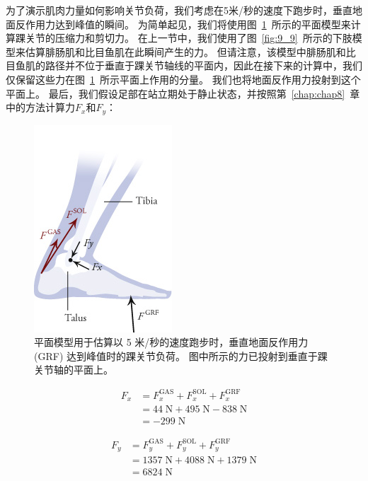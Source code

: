 为了演示肌肉力量如何影响关节负荷，我们考虑在5米/秒的速度下跑步时，垂直地面反作用力达到峰值的瞬间。
为简单起见，我们将使用图~\ref{fig:9_14}~所示的平面模型来计算踝关节的压缩力和剪切力。
在上一节中，我们使用了图~\ref{fig:9_9}~所示的下肢模型来估算腓肠肌和比目鱼肌在此瞬间产生的力。
但请注意，该模型中腓肠肌和比目鱼肌的路径并不位于垂直于踝关节轴线的平面内，因此在接下来的计算中，我们仅保留这些力在图~\ref{fig:9_14}~所示平面上作用的分量。
我们也将地面反作用力投射到这个平面上。
最后，我们假设足部在站立期处于静止状态，并按照第~\ref{chap:chap8}~章中的方法计算力$F_x$和$F_y$：


\begin{figure}[!htb]
	\centering
	\includegraphics[width=0.3\linewidth]{chap9/9_14}
	\caption{平面模型用于估算以 5 米/秒的速度跑步时，垂直地面反作用力 (GRF) 达到峰值时的踝关节负荷。
		图中所示的力已投射到垂直于踝关节轴的平面上。 \label{fig:9_14}}
\end{figure}

\begin{equation}
	\begin{aligned}
		F_x & = F_x^\text{GAS} + 
				F_x^\text{SOL} + 
				F_x^\text{GRF} \\
			& = 44 \; \text{N} + 495\;\text{N} - 838 \; \text{N} \\
			& = -299 \;\text{N}
	\end{aligned}
	\label{eq:9_3}
\end{equation}


\begin{equation}
	\begin{aligned}
		F_y & = F_y^\text{GAS} + F_y^\text{SOL} + F_y^\text{GRF} \\
		& = 1357 \; \text{N} + 4088 \; \text{N} + 1379 \; \text{N} \\
		& = 6824 \; \text{N}
	\end{aligned}
	\label{eq:9_4}
\end{equation}


